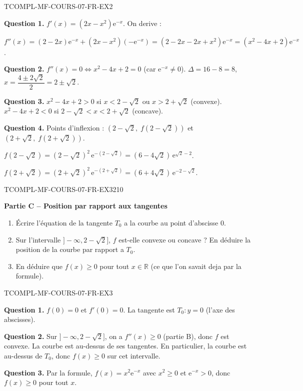 \begin{corrige}{TCOMPL-MF-COURS-07-FR-EX2}

\textbf{Question 1.} $f'(x) = (2x - x^2)\mathrm{e}^{-x}$. On derive :

$f''(x) = (2 - 2x)\mathrm{e}^{-x} + (2x - x^2)(-\mathrm{e}^{-x}) = (2 - 2x - 2x + x^2)\mathrm{e}^{-x} = (x^2 - 4x + 2)\mathrm{e}^{-x}$.

\textbf{Question 2.} $f''(x) = 0 \iff x^2 - 4x + 2 = 0$ (car $\mathrm{e}^{-x}
\neq 0$). $\Delta = 16 - 8 = 8$, $x = \dfrac{4 \pm 2\sqrt{2}}{2} = 2 \pm \sqrt{2}$.

\textbf{Question 3.} $x^2 - 4x + 2 > 0$ si $x < 2 - \sqrt{2}$ ou $x > 2 + \sqrt{2}$ (convexe). $x^2 - 4x + 2 < 0$ si $2 - \sqrt{2} < x < 2 + \sqrt{2}$ (concave).

\textbf{Question 4.} Points d'inflexion : $(2 - \sqrt{2},\; f(2-\sqrt{2}))$ et $(2 + \sqrt{2},\; f(2+\sqrt{2}))$.

$f(2-\sqrt{2}) = (2-\sqrt{2})^2\,\mathrm{e}^{-(2-\sqrt{2})} = (6-4\sqrt{2})\,\mathrm{e}^{\sqrt{2}-2}$.

$f(2+\sqrt{2}) = (2+\sqrt{2})^2\,\mathrm{e}^{-(2+\sqrt{2})} = (6+4\sqrt{2})\,\mathrm{e}^{-2-\sqrt{2}}$.

\end{corrige}

\bigskip


\begin{exercice}{TCOMPL-MF-COURS-07-FR-EX3}{2}{10}

\textbf{Partie C -- Position par rapport aux tangentes}

\begin{enumerate}
  \item Écrire l'équation de la tangente $T_0$ a la courbe au point d'abscisse $0$.
  \item Sur l'intervalle $]-\infty, 2 - \sqrt{2}]$, $f$ est-elle convexe ou concave ? En déduire la position de la courbe par rapport a $T_0$.
  \item En déduire que $f(x) \geq 0$ pour tout $x \in \mathbb{R}$ (ce que l'on savait deja par la formule).
\end{enumerate}

\end{exercice}

\begin{corrige}{TCOMPL-MF-COURS-07-FR-EX3}

\textbf{Question 1.} $f(0) = 0$ et $f'(0) = 0$. La tangente est $T_0 : y = 0$ (l'axe des abscisses).

\textbf{Question 2.} Sur $]-\infty, 2 - \sqrt{2}]$, on a $f''(x) \geq 0$ (partie B), donc $f$ est convexe. La courbe est au-dessus de ses tangentes. En particulier, la courbe est au-dessus de $T_0$, donc $f(x) \geq 0$ sur cet intervalle.

\textbf{Question 3.} Par la formule, $f(x) = x^2 \mathrm{e}^{-x}$ avec $x^2 \geq 0$ et $\mathrm{e}^{-x} > 0$, donc $f(x) \geq 0$ pour tout $x$.

\end{corrige}
